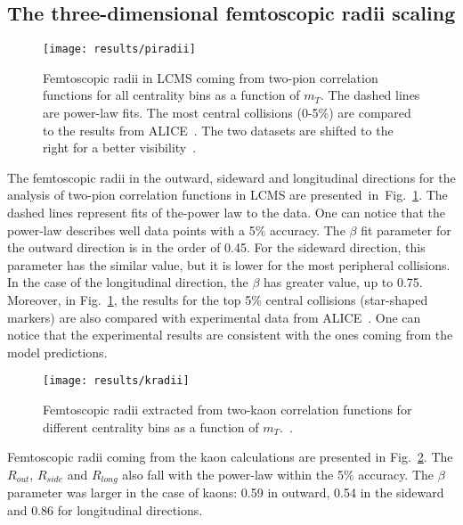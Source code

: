     \subsection{The three-dimensional femtoscopic radii scaling}
      \begin{figure}[b]
        \centering
        \centerline{\texttt{[image: results/piradii]}}
        \caption{Femtoscopic radii in LCMS coming from two-pion correlation functions for all centrality bins as a function of $m_T$. The dashed lines are power-law fits. The most central collisions (0-5\%) are compared to the results from ALICE~\cite{alice_pion}. The two datasets are shifted to the right for a better visibility~\cite{galazyn}.}
        \label{fig:piradii}
      \end{figure}
      The femtoscopic radii in the outward, sideward and longitudinal directions for the analysis of two-pion correlation functions in LCMS are presented~in~Fig.~\ref{fig:piradii}.
      The dashed lines represent fits of the-power law to the data.
      One can notice that the power-law describes well data points with a 5\% accuracy.
      The $\beta$ fit parameter for the outward direction is in the order of 0.45.
      For the sideward direction, this parameter has the similar value, but it is lower for the most peripheral collisions.
      In the case of the longitudinal direction, the $\beta$ has greater value, up to 0.75.
      Moreover, in Fig.~\ref{fig:piradii}, the results for the top 5\% central collisions (star-shaped markers) are also compared with experimental data from ALICE~\cite{alice_pion}.
      One can notice that the experimental results are consistent with the ones coming from the model predictions.
      \begin{figure}[b]
        \centering
        \centerline{\texttt{[image: results/kradii]}}
        \caption{Femtoscopic radii extracted from two-kaon correlation functions for different centrality bins as a function of $m_T$.~\cite{galazyn}.}
      \label{fig:kradii}
      \end{figure}

      Femtoscopic radii coming from the kaon calculations are presented in Fig.~\ref{fig:kradii}.
      The $R_{out}$, $R_{side}$ and $R_{long}$ also fall with the power-law within the 5\% accuracy.
      The $\beta$ parameter was larger in the case of kaons: 0.59 in outward, 0.54 in the sideward and 0.86 for longitudinal directions.

